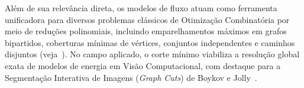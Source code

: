 Além de sua relevância direta, os modelos de fluxo atuam como ferramenta unificadora para diversos problemas clássicos de Otimização Combinatória por meio de reduções polinomiais, incluindo emparelhamentos máximos em grafos bipartidos, coberturas mínimas de vértices, conjuntos independentes e caminhos disjuntos (veja~\cite{ahuja1993network, cook1998combinatorial}). No campo aplicado, o corte mínimo viabiliza a resolução global exata de modelos de energia em Visão Computacional, com destaque para a Segmentação Interativa de Imagens (\textit{Graph Cuts}) de Boykov e Jolly~\cite{boykov2001interactive}.
